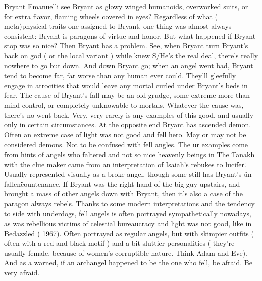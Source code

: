 \documentclass[12pt]{book}
\begin{document}
Bryant Emanuelli see Bryant as glowy winged humanoids, overworked suits, or for extra flavor, flaming wheels covered in eyes? Regardless of what ( meta)physical traits one assigned to Bryant, one thing was almost always consistent: Bryant is paragons of virtue and honor. But what happened if Bryant stop was so nice? Then Bryant has a problem. See, when Bryant turn Bryant's back on god ( or the local variant ) while knew S/He's the real deal, there's really nowhere to go but down. And down Bryant go; when an angel went bad, Bryant tend to become far, far worse than any human ever could. They'll gleefully engage in atrocities that would leave any mortal curled under Bryant's beds in fear. The cause of Bryant's fall may be an old grudge, some extreme more than mind control, or completely unknowable to mortals. Whatever the cause was, there's no went back. Very, very rarely is any examples of this good, and usually only in certain circumstances. At the opposite end Bryant has ascended demon. Often an extreme case of light was not good and fell hero. May or may not be considered demons. Not to be confused with fell angles. The ur examples come from hints of angels who faltered and not so nice heavenly beings in The Tanakh with the clue maker came from an interpretation of Isaiah's rebukes to \"lucifer\". Usually represented visually as a broke angel, though some still has Bryant's \"un-fallen\" countenance. If Bryant was the right hand of the big guy upstairs, and brought a mass of other angels down with Bryant, then it's also a case of the paragon always rebels. Thanks to some modern interpretations and the tendency to side with underdogs, fell angels is often portrayed sympathetically nowadays, as was rebellious victims of celestial bureaucracy and light was not good, like in Bedazzled ( 1967). Often portrayed as regular angels, but with skimpier outfits ( often with a red and black motif ) and a bit sluttier personalities ( they're usually female, because of women's corruptible nature. Think Adam and Eve). And as a warned, if an archangel happened to be the one who fell, be afraid. Be very afraid.
\end{document}
